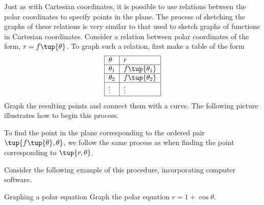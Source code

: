Just as with Cartesian coordinates, it is possible to use
relations between the polar coordinates to specify points in the plane. The
process of sketching the graphs of these relations is very similar to that used to sketch
graphs of functions in Cartesian coordinates. Consider a relation between polar coordinates of the form, $r=f\tup{\theta }$. To graph such a relation, first make a table of
the form 
\begin{equation*}
\begin{tabular}{|l|l|}
\hline
$\theta $ & $r$ \\ \hline
$\theta _{1}$ & $f\tup{\theta _{1}} $ \\ \hline
$\theta _{2}$ & $f\tup{\theta _{2}} $ \\ \hline
$\vdots $ & $\vdots $ \\ \hline
\end{tabular}
\end{equation*}
Graph the resulting points and connect them with a curve. The
following picture illustrates how to begin this process.

\begin{center}
\end{center}

To find the point in the plane corresponding to the ordered pair $\tup{f\tup{
\theta } ,\theta }$, we follow the same process as when finding the point corresponding to $\tup{r, \theta }$.

Consider the following example of this procedure, incorporating computer software.

\begin{example}{Graphing a polar equation}{}
Graph the polar equation $r=1+\cos \theta$.
\end{example}


